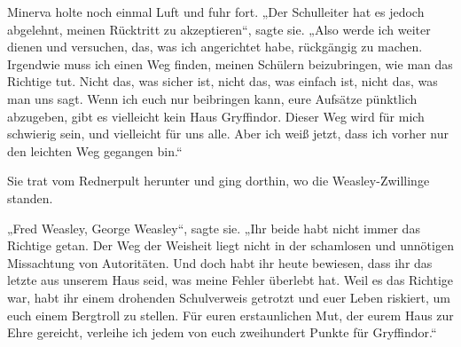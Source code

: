 \later

Minerva holte noch einmal Luft und fuhr fort.
„Der Schulleiter hat es jedoch abgelehnt, meinen Rücktritt zu akzeptieren“, sagte sie.
„Also werde ich weiter dienen und versuchen, das, was ich angerichtet habe, rückgängig zu machen. Irgendwie muss ich einen Weg finden, meinen Schülern beizubringen, wie man das Richtige tut. Nicht das, was sicher ist, nicht das, was einfach ist, nicht das, was man uns sagt. Wenn ich euch nur beibringen kann, eure Aufsätze pünktlich abzugeben, gibt es vielleicht kein Haus Gryffindor. Dieser Weg wird für mich schwierig sein, und vielleicht für uns alle. Aber ich weiß jetzt, dass ich vorher nur den leichten Weg gegangen bin.“

Sie trat vom Rednerpult herunter und ging dorthin, wo die Weasley-Zwillinge standen.

„Fred Weasley, George Weasley“, sagte sie.
„Ihr beide habt nicht immer das Richtige getan. Der Weg der Weisheit liegt nicht in der schamlosen und unnötigen Missachtung von Autoritäten. Und doch habt ihr heute bewiesen, dass ihr das letzte aus unserem Haus seid, was meine Fehler überlebt hat. Weil es das Richtige war, habt ihr einem drohenden Schulverweis getrotzt und euer Leben riskiert, um euch einem Bergtroll zu stellen. Für euren erstaunlichen Mut, der eurem Haus zur Ehre gereicht, verleihe ich jedem von euch zweihundert Punkte für Gryffindor.“

